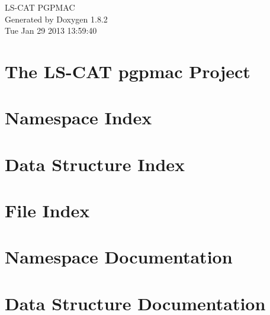\documentclass{book}
\begin{document}
\hypersetup{pageanchor=false,citecolor=blue}
\begin{titlepage}
\vspace*{7cm}
\begin{center}
{\Large L\-S-\/\-C\-A\-T P\-G\-P\-M\-A\-C }\\
\vspace*{1cm}
{\large Generated by Doxygen 1.8.2}\\
\vspace*{0.5cm}
{\small Tue Jan 29 2013 13:59:40}\\
\end{center}
\end{titlepage}
\clearemptydoublepage
{}
\tableofcontents
\clearemptydoublepage
{}
\hypersetup{pageanchor=true,citecolor=blue}
\chapter{The L\-S-\/\-C\-A\-T pgpmac Project}
\label{index}\hypertarget{index}{}
\chapter{Namespace Index}

\chapter{Data Structure Index}

\chapter{File Index}

\chapter{Namespace Documentation}


\chapter{Data Structure Documentation}



























\end{document}
